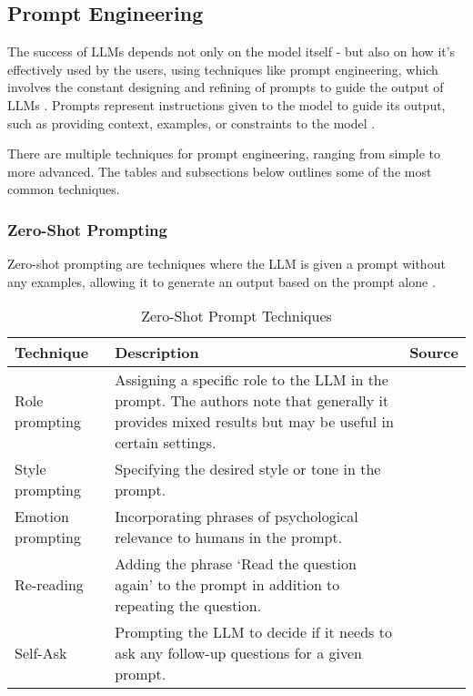 \subsection{Prompt Engineering}

The success of LLMs depends not only on the model itself - but also on how it's effectively used by the users, using techniques like prompt engineering, which involves the constant designing and refining of prompts to guide the output of LLMs \parencite{promptmed,prompt2}. Prompts represent instructions given to the model to guide its output, such as providing context, examples, or constraints to the model \parencite{prompt,prompt1,prompt2}. 

There are multiple techniques for prompt engineering, ranging from simple to more advanced. The tables and subsections below outlines some of the most common techniques.

\subsubsection{Zero-Shot Prompting}

Zero-shot prompting are techniques where the LLM is given a prompt without any examples, allowing it to generate an output based on the prompt alone \parencite{prompt1}.

\begin{table}[h!]
    \centering
    \begin{tabular}{p{3cm} p{8cm} p{2cm}}
        \toprule
        \textbf{Technique} & \textbf{Description} & \textbf{Source} \\
        \midrule
        \raggedright
        Role prompting & Assigning a specific role to the LLM in the prompt. The authors note that generally it provides mixed results but may be useful in certain settings.  & \textcite{role1} \\
        \hline
        \raggedright
        Style prompting & Specifying the desired style or tone in the prompt. & \textcite{style} \\
        \hline
        \raggedright
        Emotion prompting & Incorporating phrases of psychological relevance to humans in the prompt. & \textcite{emotion} \\
        \hline
        \raggedright
        Re-reading & Adding the phrase `Read the question again' to the prompt in addition to repeating the question. & \textcite{rereading} \\
        \hline
        \raggedright
        Self-Ask & Prompting the LLM to decide if it needs to ask any follow-up questions for a given prompt. &  \textcite{selfask} \\
        \bottomrule
    \end{tabular}
    \caption{Zero-Shot Prompt Techniques}
    \label{tab:zero_shot}
\end{table}

